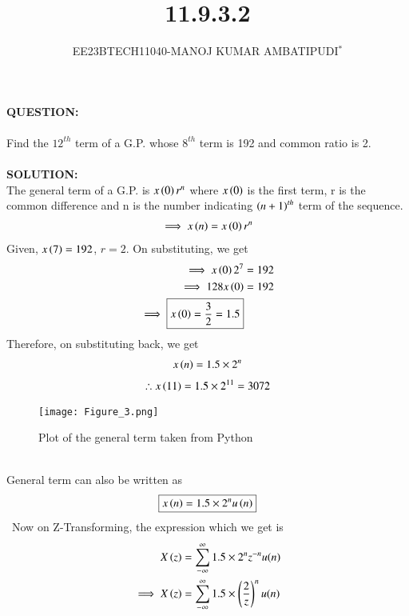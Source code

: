 \documentclass[journal,12pt,twocolumn]{IEEEtran}
\theoremstyle{remark}
\begin{document}

\vspace{3cm}
\title{\textbf{11.9.3.2}}
\author{EE23BTECH11040-MANOJ KUMAR AMBATIPUDI$^{*}$%
}
\maketitle
\newpage
\bigskip
\renewcommand{\thefigure}{\theenumi}
\renewcommand{\thetable}{\theenumi}
\textbf{QUESTION:}\\\\
Find the $12^{th}$ term of a G.P. whose $8^{th}$ term is 192 and common ratio is 2.\\\\
\textbf{SOLUTION:}\\
The general term of a G.P. is $x\left(0\right)r^{n}$ where $x\left(0\right)$ is the first term, r is the common difference and n is the number indicating $\left(n+1\right)^{th}$ term of the sequence.
\begin{align}
    \implies x\left(n\right)=x\left(0\right)r^{n}
\end{align}
Given, $x\left(7\right)=192$, $r=2$. On substituting, we get
\begin{align}
\implies x\left(0\right)2^{7}&=192\\
\implies 128x\left(0\right)&=192\\
\implies\boxed{x\left(0\right)=\dfrac{3}{2}=1.5}
\end{align}
Therefore, on substituting back, we get
\begin{align}
    x\left(n\right)=1.5\times2^{n}
\end{align}
\begin{align}
\therefore x\left(11\right) = 1.5\times2^{11} = 3072
\end{align}
\begin{figure}[h]
\renewcommand\thefigure{1} 
    \centering
    \texttt{[image: Figure\_3.png]}
    \caption{Plot of the general term taken from Python}
    \label{fig:1}
\end{figure}\\
General term can also be written as\
\begin{align}
\boxed{x\left(n\right) = 1.5\times2^{n}u\left(n\right)}
\end{align}\
Now on Z-Transforming, the expression which we get is\\
\begin{align}
X\left(z\right) &= \sum_{-\infty}^{\infty}1.5\times2^{n}z^{-n}u(n)   \\
\implies X\left(z\right) &= \sum_{-\infty}^{\infty}1.5\times\left(\dfrac{2}{z}\right)^{n}u(n)
\end{align}
\end{document}
